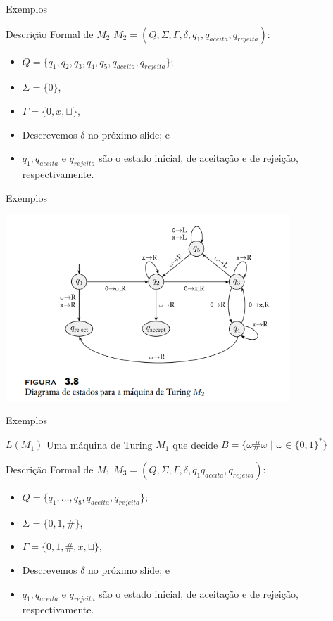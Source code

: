\documentclass[xcolor=dvipsnames,table]{beamer}
\begin{document}
	\begin{frame}{Exemplos}
		\begin{block}{Descrição Formal de $M_2$}
			$M_2 = (Q, \Sigma, \Gamma, \delta, q_1, q_{aceita}, q_{rejeita})$:
			\begin{itemize}
				\item $Q = \{ q_1, q_2, q_3, q_4, q_5, q_{aceita}, q_{rejeita} \}$;
				\item $\Sigma = \{ 0 \}$,
				\item $\Gamma = \{ 0, x, \sqcup \}$,
				\item Descrevemos $\delta$ no próximo slide; e
				\item $q_1, q_{aceita}$ e $q_{rejeita}$ são o estado inicial, de aceitação e de rejeição, respectivamente.
			\end{itemize}
		\end{block}
	\end{frame}
	
	\begin{frame}{Exemplos}
		\begin{center}
			\includegraphics[height=7cm]{images/fig38.png}
		\end{center}
	\end{frame}
	
	\begin{frame}{Exemplos}
		\begin{block}{$L(M_1)$}
			Uma máquina de Turing $M_1$ que decide $B = \{ \omega \# \omega \mbox{ | } \omega \in \{ 0, 1 \}^* \}$		
		\end{block} \pause
		\begin{block}{Descrição Formal de $M_1$}
			$M_3 = (Q, \Sigma, \Gamma, \delta, q_1 q_{aceita}, q_{rejeita})$:
			\begin{itemize}
				\item $Q = \{ q_1, \ldots, q_{8}, q_{aceita}, q_{rejeita} \}$;
				\item $\Sigma = \{ 0, 1, \# \}$,
				\item $\Gamma = \{ 0, 1, \#, x, \sqcup \}$,
				\item Descrevemos $\delta$ no próximo slide; e
				\item $q_1, q_{aceita}$ e $q_{rejeita}$ são o estado inicial, de aceitação e de rejeição, respectivamente.
			\end{itemize}
		\end{block}
	\end{frame}
	
\end{document}
